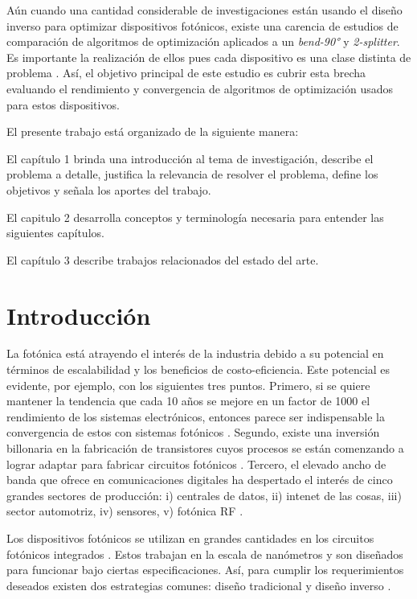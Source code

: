 Aún cuando una cantidad considerable de investigaciones están usando el diseño inverso para optimizar dispositivos fotónicos, existe una carencia de estudios de comparación de algoritmos de optimización aplicados a un \emph{bend-90°} y \emph{2-splitter}. 
Es importante la realización de ellos pues cada dispositivo es una clase distinta de problema \citep{Molesky2018}. 
Así, el objetivo principal de este estudio es cubrir esta brecha evaluando el rendimiento y convergencia de algoritmos de optimización usados para estos dispositivos.

El presente trabajo está organizado de la siguiente manera:

El capítulo 1 brinda una introducción al tema de investigación, describe el problema a detalle, justifica la relevancia de resolver el problema, define los objetivos y señala los aportes del trabajo.

El capitulo 2 desarrolla conceptos y terminología necesaria para entender las siguientes capítulos.

El capítulo 3 describe trabajos relacionados del estado del arte.

\section{Introducción}

La fotónica está atrayendo el interés de la industria debido a su potencial en términos de escalabilidad y los beneficios de costo-eficiencia. 
Este potencial es evidente, por ejemplo, con los siguientes tres puntos. 
Primero, si se quiere mantener la tendencia que cada 10 años se mejore en un factor de 1000 el rendimiento de los sistemas electrónicos, entonces parece ser indispensable la convergencia de estos con sistemas fotónicos \citep{Glick2018}. 
Segundo, existe una inversión billonaria en la fabricación de transistores cuyos procesos se están comenzando a lograr adaptar para fabricar circuitos fotónicos \citep{LukasChrostowski2010}.
Tercero, el elevado ancho de banda que ofrece en comunicaciones digitales ha despertado el interés de cinco grandes sectores de producción: i) centrales de datos, ii) intenet de las cosas, iii) sector automotriz, iv) sensores, v) fotónica RF \citep{LukasChrostowski2010, Glick2018}.

Los dispositivos fotónicos se utilizan en grandes cantidades en los circuitos fotónicos integrados \citep{LukasChrostowski2010}. 
Estos trabajan en la escala de nanómetros y son diseñados para funcionar bajo ciertas especificaciones. 
Así, para cumplir los requerimientos deseados existen dos estrategias comunes: diseño tradicional y diseño inverso \citep{Molesky2018}.


